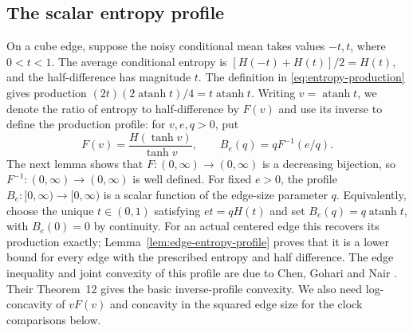 \documentclass[11pt,letterpaper]{amsart}
\newcommand{\1}{\mathbf 1}
\DeclareMathOperator{\atanh}{atanh}
\numberwithin{equation}{section}
\begin{document}
\subsection{The scalar entropy profile}

On a cube edge, suppose the noisy conditional mean takes values $-t,t$,
where $0<t<1$. The average conditional entropy is
$[H(-t)+H(t)]/2=H(t)$, and the half-difference has magnitude $t$.
The definition in \eqref{eq:entropy-production} gives production
$(2t)(2\atanh t)/4=t\atanh t$.
Writing $v=\atanh t$, we denote the ratio of entropy to half-difference
by $F(v)$ and use its inverse to define the production profile:
for $v,e,q>0$, put
\begin{equation}\label{eq:entropy-profile}
 F(v)=\frac{H(\tanh v)}{\tanh v},\qquad B_e(q)=qF^{-1}(e/q).
\end{equation}
The next lemma shows that $F:(0,\infty)\to(0,\infty)$ is a decreasing
bijection, so $F^{-1}:(0,\infty)\to(0,\infty)$ is well defined.
For fixed $e>0$, the profile $B_e:[0,\infty)\to[0,\infty)$ is a
scalar function of the edge-size parameter $q$.
Equivalently, choose the unique $t\in(0,1)$ satisfying $et=qH(t)$
and set $B_e(q)=q\atanh t$, with $B_e(0)=0$ by continuity.
For an actual centered edge this recovers its production exactly;
Lemma~\ref{lem:edge-entropy-profile} proves that it is a lower bound
for every edge with the prescribed entropy and half difference.
The edge inequality and joint convexity of this profile are due to
Chen, Gohari and Nair \cite[Lemmas~10 and~13]{ChenGohariNair2025}.
Their Theorem~12 gives the basic inverse-profile convexity.
We also need log-concavity of $vF(v)$ and concavity in the squared
edge size for the clock comparisons below.
\end{document}
